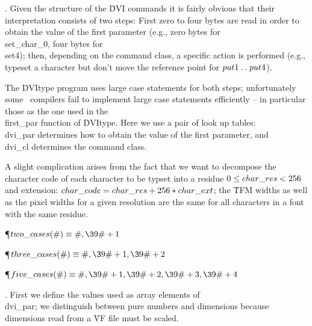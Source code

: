 . Given the structure of the \.{DVI} commands it is fairly obvious
that their interpretation consists of two steps: First zero to four
bytes are read in order to obtain the value of the first parameter
(e.g., zero bytes for \\{set\_char\_0}, four bytes for \\{set4}); then,
depending on the command class, a specific action is performed (e.g.,
typeset a character but don't move the reference point for $\\{put1}\to%
\\{put4}$).

The \.{DVItype} program uses large case statements for both steps;
unfortunately some \PASCAL\ compilers fail to implement large case
statements efficiently -- in particular those as the one used in the
\\{first\_par} function of \.{DVItype}. Here we use a pair of look up tables:
\\{dvi\_par} determines how to obtain the value of the first parameter, and
\\{dvi\_cl} determines the command class.

A slight complication arises from the fact that we want to decompose the
character code of each character to be typset into a residue
$0\le\\{char\_res}<256$ and extension: $\\{char\_code}=\\{char\_res}+256\ast%
\\{char\_ext}$;
the \.{TFM} widths as well as the pixel widths for a given resolution
are the same for all characters in a font with the same residue.

\Y\P\D {}$\\{two\_cases}(\#)\S\#,\39\#+1$\par
\P\D {}$\\{three\_cases}(\#)\S\#,\39\#+1,\39\#+2$\par
\P\D {}$\\{five\_cases}(\#)\S\#,\39\#+1,\39\#+2,\39\#+3,\39\#+4$\par
\fi

. First we define the values used as array elements of \\{dvi\_par}; we
distinguish between pure numbers and dimensions because dimensions read
from a \.{VF} file must be scaled.

